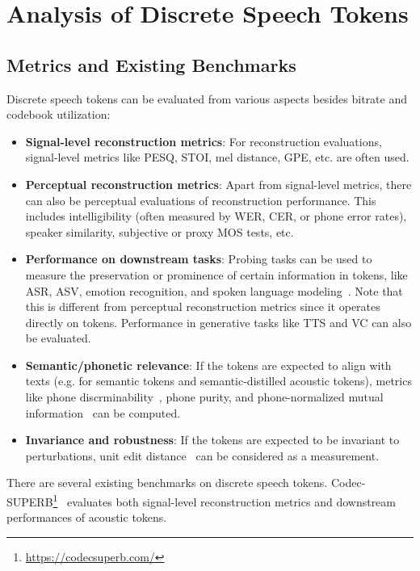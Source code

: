
\section{Analysis of Discrete Speech Tokens}
\label{sec:analysis}
\subsection{Metrics and Existing Benchmarks}

Discrete speech tokens can be evaluated from various aspects besides bitrate and codebook utilization:
\begin{itemize}
    \item \textbf{Signal-level reconstruction metrics}: 
    For reconstruction evaluations, signal-level metrics like
    PESQ, STOI, mel distance, GPE, etc. are often used.
    \item \textbf{Perceptual reconstruction metrics}: Apart from  signal-level metrics, there can also be perceptual evaluations of reconstruction performance. This includes intelligibility (often measured by WER, CER, or phone error rates), speaker similarity, subjective or proxy MOS tests, etc.
    \item \textbf{Performance on downstream tasks}: Probing tasks can be used to measure the preservation or prominence of certain information in tokens, like ASR, ASV, emotion recognition, and spoken language modeling~\cite{nguyen2020zero}.
    Note that this is different from perceptual reconstruction metrics since it operates directly on tokens.
    Performance in generative tasks like TTS and VC can also be evaluated.
    \item \textbf{Semantic/phonetic relevance}: If the tokens are expected to align with texts (e.g. for semantic tokens and semantic-distilled acoustic tokens), metrics like phone discrminability~\cite{nguyen2020zero}, phone purity, and phone-normalized mutual information~\cite{hsu2021hubert} can be computed.
    \item \textbf{Invariance and robustness}: If the tokens are expected to be invariant to perturbations, unit edit distance~\cite{gat2023augmentation} can be considered as a measurement.
\end{itemize}
There are several existing benchmarks on discrete speech tokens. 
Codec-SUPERB\footnote{\scriptsize\url{https://codecsuperb.com/}}~\cite{wu2024codec} evaluates both signal-level reconstruction metrics and downstream performances of acoustic tokens.
